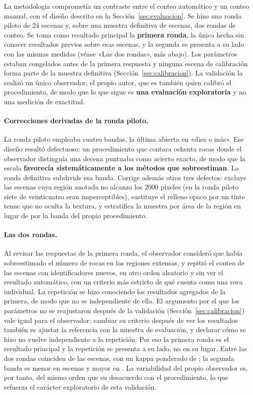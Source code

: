 La metodología comprometía un contraste entre el conteo automático y un conteo manual, con el
diseño descrito en la Sección~\ref{sec:evaluacion}. Se hizo una ronda piloto de
\num{24} escenas y, sobre una muestra definitiva de \cVN{} escenas, dos rondas de conteo. Se
toma como resultado principal la \textbf{primera ronda}, la única hecha sin conocer resultados
previos sobre esas escenas, y la segunda se presenta a su lado con las mismas medidas (véase «Las
dos rondas», más abajo). Los parámetros estaban congelados antes de la primera respuesta y
ninguna escena de calibración forma parte de la muestra definitiva
(Sección~\ref{sec:calibracion}). La validación la realizó un único observador, el propio autor,
que es también quien calibró el procedimiento, de modo que lo que sigue es \textbf{una
evaluación exploratoria} y no una medición de exactitud.

\paragraph{Correcciones derivadas de la ronda piloto.} La ronda piloto empleaba cuatro bandas,
la última abierta en «diez o más». Ese diseño resultó defectuoso: un procedimiento que contara
ochenta rocas donde el observador distinguía una decena puntuaba como acierto exacto, de modo
que la escala \textbf{favorecía sistemáticamente a los métodos que sobreestiman}. La ronda
definitiva subdivide esa banda. Corrige además otros tres defectos: excluye las escenas cuya
región anotada no alcanza los \num{2000} píxeles (en la ronda piloto siete de veinticuatro eran
imperceptibles), sustituye el relleno opaco por un tinte tenue que no oculta la textura, y
estratifica la muestra por área de la región en lugar de por la banda del propio
procedimiento.

\paragraph{Las dos rondas.} Al revisar las respuestas de la primera ronda, el observador
consideró que había sobreestimado el número de rocas en las regiones extensas, y repitió el
conteo de las \cVN{} escenas con identificadores nuevos, en otro orden aleatorio y sin ver el
resultado automático, con un criterio más estricto de qué cuenta como una roca individual. La
repetición se hizo conociendo los resultados agregados de la primera, de modo que no es
independiente de ella. El argumento por el que los parámetros no se reajustaron después de la
validación (Sección~\ref{sec:calibracion}) vale igual para el observador: cambiar su criterio
después de ver los resultados también es ajustar la referencia con la muestra de evaluación, y
declarar cómo se hizo no vuelve independiente a la repetición. Por eso la primera ronda es el
resultado principal y la repetición se presenta a su lado, no en su lugar. Entre las dos rondas
coinciden \cVIntraCoinc{} de las \cVN{} escenas, con un kappa ponderado de \cVIntraKappaPond; la
segunda banda es menor en \cVRecMenor{} escenas y mayor en \cVRecMayor. La variabilidad del
propio observador es, por tanto, del mismo orden que su desacuerdo con el procedimiento, lo que
refuerza el carácter exploratorio de esta validación.

